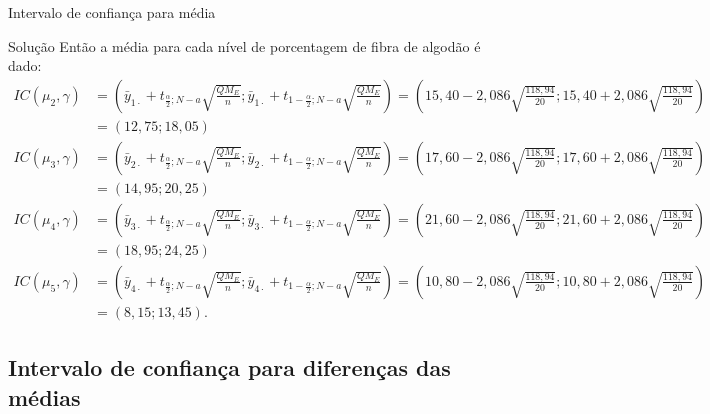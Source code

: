 \documentclass[8pt]{beamer}
\begin{document}
\begin{frame}{Intervalo de confiança para média}

\footnotesize
\begin{block}{Solução}
	Então a média para cada nível de porcentagem de fibra de algodão é dado:
	\begin{align*}
	IC(\mu_2, \gamma) &= \left( \bar{y}_{1\cdot} + t_{\frac{\alpha}{2};N - a} \sqrt{\frac{QM_E}{n}};  \bar{y}_{1\cdot} + t_{1-\frac{\alpha}{2};N - a} \sqrt{\frac{QM_E}{n}}  \right)= \left( 15,40 - 2,086 \sqrt{\frac{118,94}{20}}; 15,40 + 2,086 \sqrt{\frac{118,94}{20}} \right)\\
	 &= \left( 12,75; 18,05 \right)\\
	IC(\mu_3, \gamma) &= \left( \bar{y}_{2\cdot} + t_{\frac{\alpha}{2};N - a} \sqrt{\frac{QM_E}{n}};  \bar{y}_{2\cdot} + t_{1-\frac{\alpha}{2};N - a} \sqrt{\frac{QM_E}{n}}  \right) = \left( 17,60 - 2,086 \sqrt{\frac{118,94}{20}}; 17,60 + 2,086 \sqrt{\frac{118,94}{20}} \right)\\ 
	&= \left( 14,95; 20,25 \right)\\
	IC(\mu_4, \gamma) &= \left( \bar{y}_{3\cdot} + t_{\frac{\alpha}{2};N - a} \sqrt{\frac{QM_E}{n}};  \bar{y}_{3\cdot} + t_{1-\frac{\alpha}{2};N - a} \sqrt{\frac{QM_E}{n}}  \right)= \left( 21,60 - 2,086 \sqrt{\frac{118,94}{20}}; 21,60 + 2,086 \sqrt{\frac{118,94}{20}} \right)\\
	&= \left( 18,95; 24,25 \right)\\
	IC(\mu_5, \gamma) &= \left( \bar{y}_{4\cdot} + t_{\frac{\alpha}{2};N - a} \sqrt{\frac{QM_E}{n}};  \bar{y}_{4\cdot} + t_{1-\frac{\alpha}{2};N - a} \sqrt{\frac{QM_E}{n}}  \right)= \left( 10,80 - 2,086 \sqrt{\frac{118,94}{20}}; 10,80 + 2,086 \sqrt{\frac{118,94}{20}} \right)\\
	&= \left( 8,15; 13,45 \right).
	\end{align*}
\end{block}
\normalsize

\end{frame}

\subsection{Intervalo de confiança para diferenças das médias}
\end{document}
